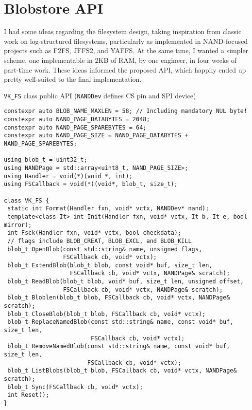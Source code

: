 \documentclass[letterpaper,10pt]{article}
\begin{document}
\section{Blobstore API}
I had some ideas regarding the filesystem design, taking inspiration from
classic work on log-structured filesystems\parencite{sprite}, particularly
as implemented in NAND-focused projects such as F2FS\parencite{f2fs},
JFFS2\parencite{jffs}, and YAFFS\parencite{yaffs}. At the same time, I wanted
a simpler scheme, one implementable in 2KB of RAM, by one engineer, in four
weeks of part-time work. These ideas informed the proposed API, which happily
ended up pretty well-suited to the final implementation.

\begin{listing}[ht]
\caption{{\texttt{VK\_FS}} class public API ({\texttt{NANDDev}} defines CS pin and SPI device)}
\begin{verbatim}
constexpr auto BLOB_NAME_MAXLEN = 58; // Including mandatory NUL byte!
constexpr auto NAND_PAGE_DATABYTES = 2048;
constexpr auto NAND_PAGE_SPAREBYTES = 64;
constexpr auto NAND_PAGE_SIZE = NAND_PAGE_DATABYTES + NAND_PAGE_SPAREBYTES;

using blob_t = uint32_t;
using NANDPage = std::array<uint8_t, NAND_PAGE_SIZE>;
using Handler = void(*)(void *, int);
using FSCallback = void(*)(void*, blob_t, size_t);

class VK_FS {
 static int Format(Handler fxn, void* vctx, NANDDev* nand);
 template<class It> int Init(Handler fxn, void* vctx, It b, It e, bool mirror);
 int Fsck(Handler fxn, void* vctx, bool checkdata);
 // flags include BLOB_CREAT, BLOB_EXCL, and BLOB_KILL
 blob_t OpenBlob(const std::string& name, unsigned flags,
                 FSCallback cb, void* vctx);
 blob_t ExtendBlob(blob_t blob, const void* buf, size_t len,
                   FSCallback cb, void* vctx, NANDPage& scratch);
 blob_t ReadBlob(blob_t blob, void* buf, size_t len, unsigned offset,
                 FSCallback cb, void* vctx, NANDPage& scratch);
 blob_t Bloblen(blob_t blob, FSCallback cb, void* vctx, NANDPage& scratch);
 blob_t CloseBlob(blob_t blob, FSCallback cb, void* vctx);
 blob_t ReplaceNamedBlob(const std::string& name, const void* buf, size_t len,
                         FSCallback cb, void* vctx);
 blob_t RemoveNamedBlob(const std::string& name, const void* buf, size_t len,
                        FSCallback cb, void* vctx);
 blob_t ListBlobs(blob_t blob, FSCallback cb, void* vctx, NANDPage& scratch);
 blob_t Sync(FSCallback cb, void* vctx);
 int Reset();
}
\end{verbatim}
\end{listing}
\end{document}
